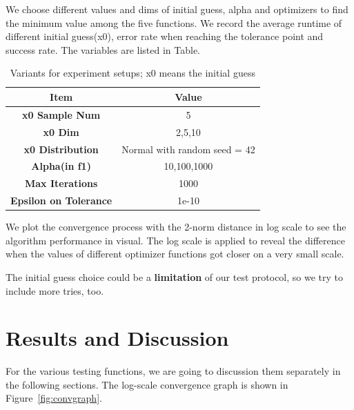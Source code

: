 \documentclass[12pt]{article}
\begin{document}

We choose different values and dims of initial guess, alpha and optimizers to find the minimum value among the five functions. We record the average runtime of different initial guess(x0), error rate when reaching the tolerance point and success rate. The variables are listed in Table. %

\begin{table}[h!]
\label{table:rule}
\centering
\begin{tabular}{cc}
\toprule
 \textbf{Item} & \textbf{Value} \\ 
\midrule
\textbf{x0 Sample Num} & 5 \\
\textbf{x0 Dim} & {2,5,10} \\
\textbf{x0 Distribution} & Normal with random seed = 42 \\
\textbf{Alpha(in f1)} & {10,100,1000} \\
\textbf{Max Iterations} & 1000 \\
\textbf{Epsilon on Tolerance} & 1e-10 \\
\bottomrule
\end{tabular}
\caption{Variants for experiment setups; x0 means the initial guess}
\end{table}

We plot the convergence process with the 2-norm distance in log scale to see the algorithm performance in visual. The log scale is applied to reveal the difference when the values of different optimizer functions got closer on a very small scale. 

The initial guess choice could be a \textbf{limitation} of our test protocol, so we try to include more tries, too.

\section{Results and Discussion}

For the various testing functions, we are going to discussion them separately in the following sections. The log-scale convergence graph is shown in Figure~\ref{fig:convgraph}.
\end{document}
